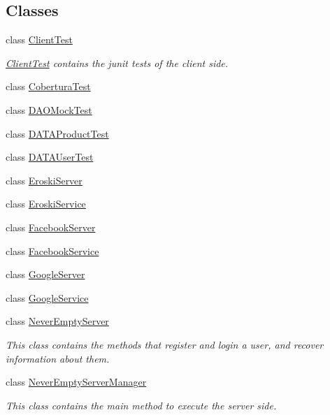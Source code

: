 \subsection*{Classes}
\begin{DoxyCompactItemize}
\item 
class \mbox{\hyperlink{class_s_p_q_1_1_client_test}{Client\+Test}}
\begin{DoxyCompactList}\small\item\em \mbox{\hyperlink{class_s_p_q_1_1_client_test}{Client\+Test}} contains the junit tests of the client side. \end{DoxyCompactList}\item 
class \mbox{\hyperlink{class_s_p_q_1_1_cobertura_test}{Cobertura\+Test}}
\item 
class \mbox{\hyperlink{class_s_p_q_1_1_d_a_o_mock_test}{D\+A\+O\+Mock\+Test}}
\item 
class \mbox{\hyperlink{class_s_p_q_1_1_d_a_t_a_product_test}{D\+A\+T\+A\+Product\+Test}}
\item 
class \mbox{\hyperlink{class_s_p_q_1_1_d_a_t_a_user_test}{D\+A\+T\+A\+User\+Test}}
\item 
class \mbox{\hyperlink{class_s_p_q_1_1_eroski_server}{Eroski\+Server}}
\item 
class \mbox{\hyperlink{class_s_p_q_1_1_eroski_service}{Eroski\+Service}}
\item 
class \mbox{\hyperlink{class_s_p_q_1_1_facebook_server}{Facebook\+Server}}
\item 
class \mbox{\hyperlink{class_s_p_q_1_1_facebook_service}{Facebook\+Service}}
\item 
class \mbox{\hyperlink{class_s_p_q_1_1_google_server}{Google\+Server}}
\item 
class \mbox{\hyperlink{class_s_p_q_1_1_google_service}{Google\+Service}}
\item 
class \mbox{\hyperlink{class_s_p_q_1_1_never_empty_server}{Never\+Empty\+Server}}
\begin{DoxyCompactList}\small\item\em This class contains the methods that register and login a user, and recover information about them. \end{DoxyCompactList}\item 
class \mbox{\hyperlink{class_s_p_q_1_1_never_empty_server_manager}{Never\+Empty\+Server\+Manager}}
\begin{DoxyCompactList}\small\item\em This class contains the main method to execute the server side. \end{DoxyCompactList}\item 

\end{DoxyCompactItemize}
